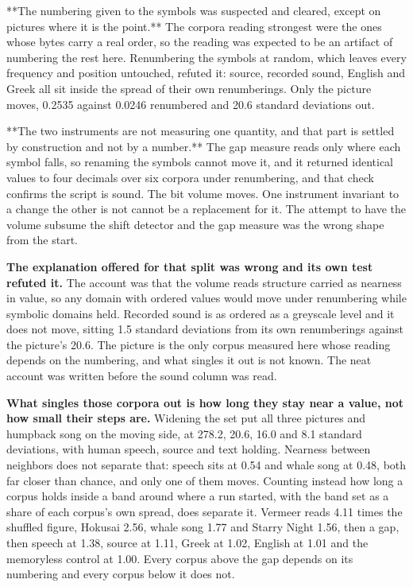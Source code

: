 **The numbering given to the symbols was suspected and cleared, except on pictures where it is the point.** The corpora reading strongest were the ones whose bytes carry a real order, so the reading was expected to be an artifact of numbering the rest here. Renumbering the symbols at random, which leaves every frequency and position untouched, refuted it: source, recorded sound, English and Greek all sit inside the spread of their own renumberings. Only the picture moves, 0.2535 against 0.0246 renumbered and 20.6 standard deviations out.

**The two instruments are not measuring one quantity, and that part is settled by construction and not by a number.** The gap measure reads only where each symbol falls, so renaming the symbols cannot move it, and it returned identical values to four decimals over six corpora under renumbering, and that check confirms the script is sound. The bit volume moves. One instrument invariant to a change the other is not cannot be a replacement for it. The attempt to have the volume subsume the shift detector and the gap measure was the wrong shape from the start.

\textbf{The explanation offered for that split was wrong and its own test refuted it.} The account was that the volume reads structure carried as nearness in value, so any domain with ordered values would move under renumbering while symbolic domains held. Recorded sound is as ordered as a greyscale level and it does not move, sitting 1.5 standard deviations from its own renumberings against the picture's 20.6. The picture is the only corpus measured here whose reading depends on the numbering, and what singles it out is not known. The neat account was written before the sound column was read.

\textbf{What singles those corpora out is how long they stay near a value, not how small their steps are.} Widening the set put all three pictures and humpback song on the moving side, at 278.2, 20.6, 16.0 and 8.1 standard deviations, with human speech, source and text holding. Nearness between neighbors does not separate that: speech sits at 0.54 and whale song at 0.48, both far closer than chance, and only one of them moves. Counting instead how long a corpus holds inside a band around where a run started, with the band set as a share of each corpus's own spread, does separate it. Vermeer reads 4.11 times the shuffled figure, Hokusai 2.56, whale song 1.77 and Starry Night 1.56, then a gap, then speech at 1.38, source at 1.11, Greek at 1.02, English at 1.01 and the memoryless control at 1.00. Every corpus above the gap depends on its numbering and every corpus below it does not.

